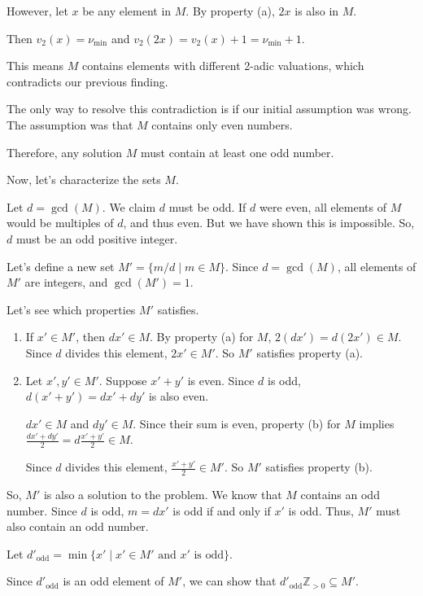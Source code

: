 \documentclass[12pt,a4paper]{article}
\theoremstyle{definition}
\begin{document}
        However, let $x$ be any element in $M$. By property (a), $2x$ is also in $M$.

        Then $v_2(x) = \nu_{\min}$ and $v_2(2x) = v_2(x)+1 = \nu_{\min}+1$.

        This means $M$ contains elements with different 2-adic valuations, which contradicts our previous finding.

        The only way to resolve this contradiction is if our initial assumption was wrong. The assumption was that $M$ contains only even numbers.

        Therefore, any solution $M$ must contain at least one odd number.

        Now, let's characterize the sets $M$.

        Let $d = \gcd(M)$. We claim $d$ must be odd. If $d$ were even, all elements of $M$ would be multiples of $d$, and thus even. But we have shown this is impossible. So, $d$ must be an odd positive integer.

        Let's define a new set $M' = \{m/d \mid m \in M\}$. Since $d = \gcd(M)$, all elements of $M'$ are integers, and $\gcd(M') = 1$.

        Let's see which properties $M'$ satisfies.
        \begin{enumerate}
            \item If $x' \in M'$, then $d x' \in M$. By property (a) for $M$, $2(d x') = d(2x') \in M$. Since $d$ divides this element, $2x' \in M'$. So $M'$ satisfies property (a).
            \item Let $x', y' \in M'$. Suppose $x'+y'$ is even. Since $d$ is odd, $d(x'+y') = dx'+dy'$ is also even.

            $dx' \in M$ and $dy' \in M$. Since their sum is even, property (b) for $M$ implies $\frac{dx'+dy'}{2} = d\frac{x'+y'}{2} \in M$.

            Since $d$ divides this element, $\frac{x'+y'}{2} \in M'$. So $M'$ satisfies property (b).
        \end{enumerate}

        So, $M'$ is also a solution to the problem. We know that $M$ contains an odd number. Since $d$ is odd, $m=dx'$ is odd if and only if $x'$ is odd. Thus, $M'$ must also contain an odd number.

        Let $d'_{\text{odd}} = \min\{x' \mid x' \in M' \text{ and } x' \text{ is odd}\}$.

        Since $d'_{\text{odd}}$ is an odd element of $M'$, we can show that $d'_{\text{odd}}\mathbb{Z}_{>0} \subseteq M'$.
\end{document}
